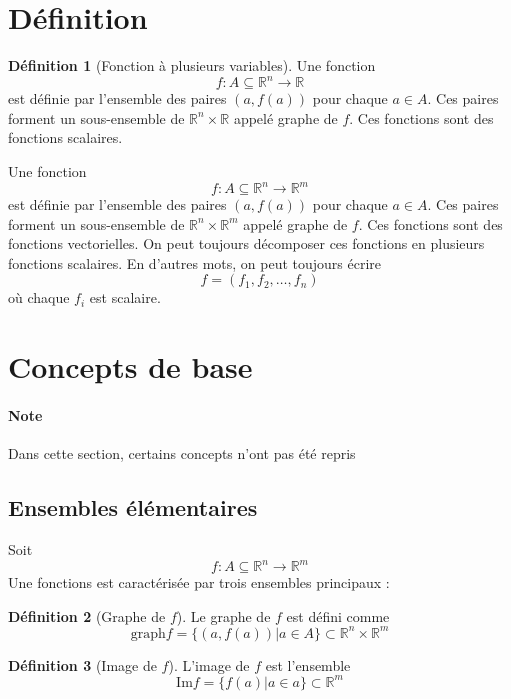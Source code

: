 \documentclass[11pt,a4paper]{article}
\theoremstyle{definition}
\newtheorem{mydef}{Définition}[section]
\newcommand{\R}{\mathbb{R}}
\begin{document}
\section{Définition}


\begin{mydef}[Fonction à plusieurs variables]
Une fonction
\[ f : A \subseteq \R^n \rightarrow \R \]
est définie par l'ensemble des paires $(a,f(a))$ pour chaque $a \in A$. Ces paires forment un sous-ensemble de $\R^n \times \R$ appelé graphe de $f$. Ces fonctions sont des fonctions scalaires.

Une fonction
\[ f : A \subseteq \R^n \rightarrow \R^m \]
est définie par l'ensemble des paires $(a,f(a))$ pour chaque $a \in A$. Ces paires forment un sous-ensemble de $\R^n \times \R^m$ appelé graphe de $f$. Ces fonctions sont des fonctions vectorielles. On peut toujours décomposer ces fonctions en plusieurs fonctions scalaires. En d'autres mots, on peut toujours écrire
\[ f = (f_1, f_2, \dots, f_n) \]
où chaque $f_i$ est scalaire.
\end{mydef}



\section{Concepts de base}

\paragraph{Note} Dans cette section, certains concepts n'ont pas été repris

\subsection{Ensembles élémentaires}
Soit
\[ f : A \subseteq \R^n \rightarrow \R^m \]
Une fonctions est caractérisée par trois ensembles principaux :
\begin{mydef} [Graphe de $f$] Le graphe de $f$ est défini comme
\[ \mathrm{graph} f = \{(a,f(a))| a \in A\} \subset \R^n \times \R^m \]
\end{mydef}

\begin{mydef} [Image de $f$] L'image de $f$ est l'ensemble
\[ \mathrm{Im} f = \{ f(a) | a \in a\} \subset \R^m \]
\end{mydef}
\end{document}

